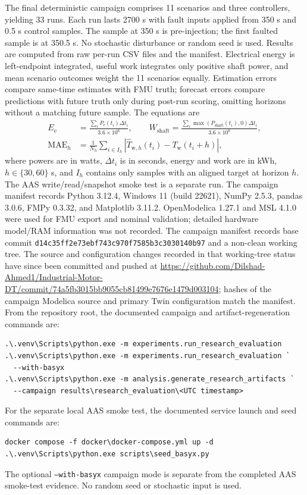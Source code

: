 \documentclass[machines,article,submit,moreauthors]{Definitions/mdpi}
\begin{document}
The final deterministic campaign comprises 11 scenarios and three controllers, yielding 33 runs. Each run lasts 2700 s with fault inputs applied from 350 s and 0.5 s control samples. The sample at 350 s is pre-injection; the first faulted sample is at 350.5 s. No stochastic disturbance or random seed is used. Results are computed from raw per-run CSV files and the manifest. Electrical energy is left-endpoint integrated, useful work integrates only positive shaft power, and mean scenario outcomes weight the 11 scenarios equally. Estimation errors compare same-time estimates with FMU truth; forecast errors compare predictions with future truth only during post-run scoring, omitting horizons without a matching future sample. The equations are
\begin{equation}
\begin{aligned}
E_{\mathrm{e}}&=\frac{\sum_i P_{\mathrm{e}}(t_i)\Delta t_i}{3.6\times10^6},\qquad
W_{\mathrm{shaft}}=\frac{\sum_i\max(P_{\mathrm{shaft}}(t_i),0)\Delta t_i}{3.6\times10^6},\\
\mathrm{MAE}_{h}&=\frac{1}{N_h}\sum_{i\in I_h}
\left|\widehat{T}_{\mathrm{w},h}(t_i)-T_{\mathrm{w}}(t_i+h)\right|,
\end{aligned}
\label{eq:metrics}
\end{equation}
where powers are in watts, $\Delta t_i$ is in seconds, energy and work are in kWh, $h\in\{30,60\}$ s, and $I_h$ contains only samples with an aligned target at horizon $h$. The AAS write/read/snapshot smoke test is a separate run. The campaign manifest records Python 3.12.4, Windows 11 (build 22621), NumPy 2.5.3, pandas 3.0.6, FMPy 0.3.32, and Matplotlib 3.11.2. OpenModelica 1.27.1 and MSL 4.1.0 were used for FMU export and nominal validation; detailed hardware model/RAM information was not recorded. The campaign manifest records base commit \texttt{d14c35ff2e73ebf743c970f7585b3c3030140b97} and a non-clean working tree. The source and configuration changes recorded in that working-tree status have since been committed and pushed at \url{https://github.com/Dilshad-Ahmed1/Industrial-Motor-DT/commit/74a5fb3015bb9055cb81499e7676e1479d003104}; hashes of the campaign Modelica source and primary Twin configuration match the manifest. From the repository root, the documented campaign and artifact-regeneration commands are:
\begin{verbatim}
.\.venv\Scripts\python.exe -m experiments.run_research_evaluation
.\.venv\Scripts\python.exe -m experiments.run_research_evaluation `
  --with-basyx
.\.venv\Scripts\python.exe -m analysis.generate_research_artifacts `
  --campaign results\research_evaluation\<UTC timestamp>
\end{verbatim}
For the separate local AAS smoke test, the documented service launch and seed commands are:
\begin{verbatim}
docker compose -f docker\docker-compose.yml up -d
.\.venv\Scripts\python.exe scripts\seed_basyx.py
\end{verbatim}
The optional \texttt{--with-basyx} campaign mode is separate from the completed AAS smoke-test evidence. No random seed or stochastic input is used.
\end{document}
